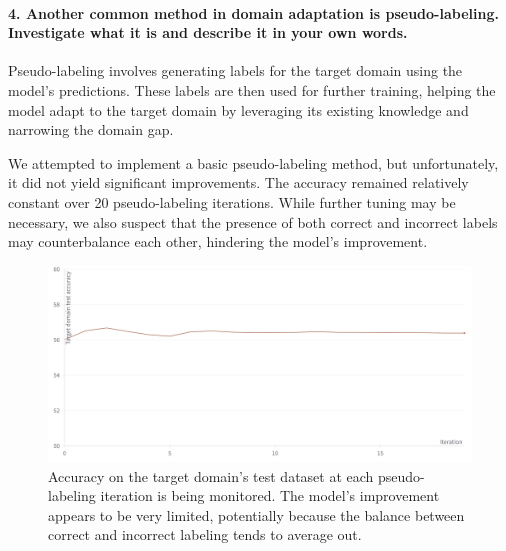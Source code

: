 \paragraph*{4. Another common method in domain adaptation is pseudo-labeling. Investigate what it is and describe it in your own words.}

Pseudo-labeling involves generating labels for the target domain using the model's predictions. These labels are then used for further training, helping the model adapt to the target domain by leveraging its existing knowledge and narrowing the domain gap.

We attempted to implement a basic pseudo-labeling method, but unfortunately, it did not yield significant improvements. The accuracy remained relatively constant over 20 pseudo-labeling iterations. While further tuning may be necessary, we also suspect that the presence of both correct and incorrect labels may counterbalance each other, hindering the model's improvement.

\begin{figure}[htbp]
    \centering
    \includegraphics[width=.8\textwidth]{pseudo_labeling.png}
    \caption{Accuracy on the target domain's test dataset at each pseudo-labeling iteration is being monitored. The model's improvement appears to be very limited, potentially because the balance between correct and incorrect labeling tends to average out.}
    \label{fig:pseudo_labeling}
\end{figure}


